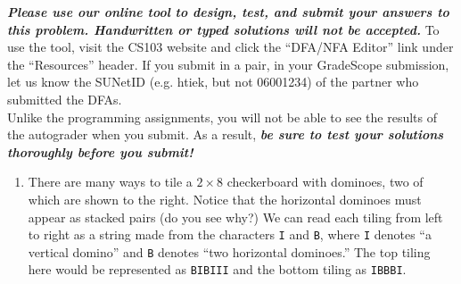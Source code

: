 \documentclass{article}
\renewcommand{\(}{\left(}
\renewcommand{\)}{\right)}
\theoremstyle{plain}
\theoremstyle{plain}
\theoremstyle{definition}
\renewcommand{\emph}[1]{\textit{\textbf{#1}}}
\newcommand{\ttt}[1]{\texttt{#1}}
\begin{document}
\emph{Please use our online tool to design, test, and submit your answers to this problem. Handwritten or typed solutions will not be accepted.} To use the tool, visit the CS103 website and click the ``DFA/NFA Editor'' link under the ``Resources'' header. If you submit in a pair, in your GradeScope submission, let us know the SUNetID (e.g. htiek, but not 06001234) of the partner who submitted the DFAs. \\

Unlike the programming assignments, you will not be able to see the results of the autograder when you submit. As a result, \emph{be sure to test your solutions thoroughly before you submit!}

\begin{enumerate}[label*=\roman*.,ref=\roman*]
    \item 
    \begin{minipage}[t]{.55\textwidth}
    There are many ways to tile a $2 \times 8$ checkerboard with dominoes, two of which are shown to the right. Notice that the horizontal dominoes must appear as stacked pairs (do you see why?) We can read each tiling from left to right as a string made from the characters \ttt{I} and \ttt{B}, where \ttt{I} denotes ``a vertical domino'' and \ttt{B} denotes ``two horizontal dominoes.'' The top tiling here would be represented as \ttt{BIBIII} and the bottom tiling as \ttt{IBBBI}.
    \end{minipage}
    \quad
    \begin{minipage}[t]{.4\textwidth}
     \\
    

\end{minipage}
\end{enumerate}
\end{document}
